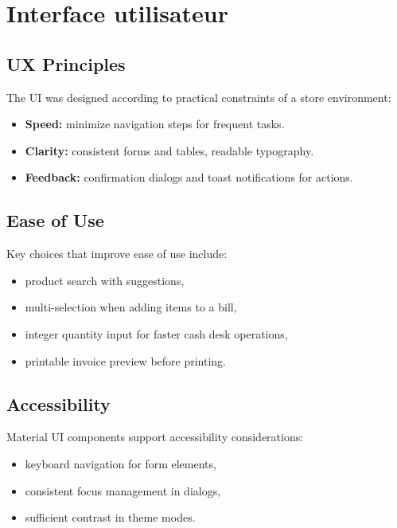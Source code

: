 \documentclass[12pt,a4paper]{report}
\begin{document}
\chapter{Interface utilisateur}

\section{UX Principles}
The UI was designed according to practical constraints of a store environment:
\begin{itemize}
  \item \textbf{Speed:} minimize navigation steps for frequent tasks.
  \item \textbf{Clarity:} consistent forms and tables, readable typography.
  \item \textbf{Feedback:} confirmation dialogs and toast notifications for actions.
\end{itemize}

\section{Ease of Use}
Key choices that improve ease of use include:
\begin{itemize}
  \item product search with suggestions,
  \item multi-selection when adding items to a bill,
  \item integer quantity input for faster cash desk operations,
  \item printable invoice preview before printing.
\end{itemize}

\section{Accessibility}
Material UI components support accessibility considerations:
\begin{itemize}
  \item keyboard navigation for form elements,
  \item consistent focus management in dialogs,
  \item sufficient contrast in theme modes.
\end{itemize}

\end{document}
